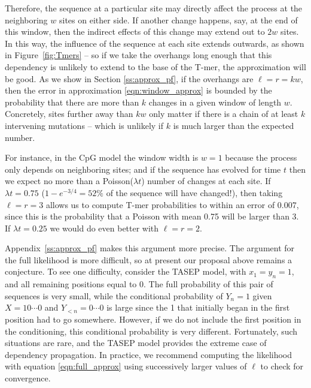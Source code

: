 \documentclass{article}
\theoremstyle{plain}
\theoremstyle{definition}
\begin{document}
Therefore, the sequence at a particular site may directly affect the process at the neighboring $w$ sites on either side.
If another change happens, say, at the end of this window,
then the indirect effects of this change may extend out to $2w$ sites.
In this way, the influence of the sequence at each site extends outwards, as shown in Figure~\ref{fig:Tmers} --
so if we take the overhangs long enough that this dependency is unlikely to extend to the base of the T-mer,
the approximation will be good.
As we show in Section \ref{ss:approx_pf}, if the overhangs are $\ell = r = kw$,
then the error in approximation \eqref{eqn:window_approx}
is bounded by the probability that there are more than $k$ changes in a given window of length $w$.
Concretely, sites further away than $kw$ only matter if there is a chain of at least $k$ intervening mutations
-- which is unlikely if $k$ is much larger than the expected number.

For instance, in the CpG model the window width is $w=1$
because the process only depends on neighboring sites;
and if the sequence has evolved for time $t$ then we expect no more than a Poisson($\lambda t$) number of changes at each site.
If $\lambda t = 0.75$ ($1-e^{-3/4}=52\%$ of the sequence will have changed!),
then taking $\ell = r = 3$ allows us to compute T-mer probabilities to within an error of 0.007,
since this is the probability that a Poisson with mean 0.75 will be larger than 3.
If $\lambda t = 0.25$ we would do even better with $\ell = r = 2$.

Appendix~\ref{ss:approx_pf} makes this argument more precise.
The argument for the full likelihood is more difficult,
so at present our proposal above remains a conjecture.
To see one difficulty, consider the TASEP model,
with $x_1 = y_n = 1$, and all remaining positions equal to 0.
The full probability of this pair of sequences is very small,
while the conditional probability of $Y_n=1$ given $X=10\cdots0$ and $Y_{<n} = 0\cdots0$
is large since the 1 that initially began in the first position
had to go somewhere.
However, if we do not include the first position in the conditioning,
this conditional probability is very different.
Fortunately, such situations are rare,
and the TASEP model provides the extreme case of dependency propagation.
In practice, we recommend computing the likelihood with equation \eqref{eqn:full_approx}
using successively larger values of $\ell$
to check for convergence.
\end{document}
